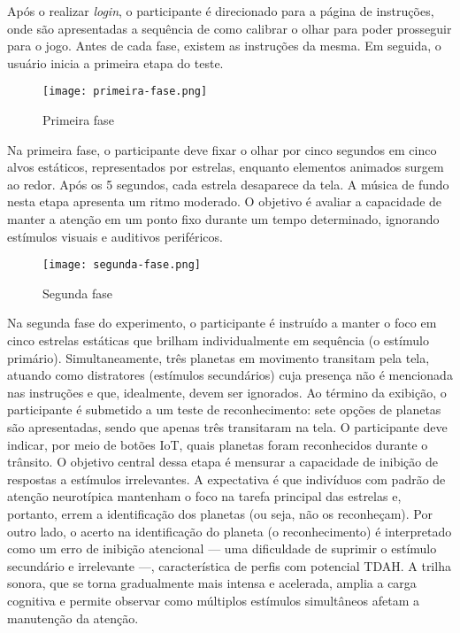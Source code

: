 Após o realizar \textit{login}, o participante é direcionado para a página de instruções, onde são apresentadas a sequência de como calibrar o olhar para poder prosseguir para o jogo. Antes de cada fase, existem as instruções da mesma. Em seguida, o usuário inicia a primeira etapa do teste. 

\begin{figure}[H]
    \centering
    \caption{Primeira fase}%
    \label{fig:primeira-fase}
    \texttt{[image: primeira-fase.png]}%
\end{figure}

Na primeira fase, o participante deve fixar o olhar por cinco segundos em cinco alvos estáticos,
representados por estrelas, enquanto elementos animados surgem ao redor. Após os 5 segundos,
cada estrela desaparece da tela. A música de fundo nesta etapa apresenta um ritmo moderado. O
objetivo é avaliar a capacidade de manter a atenção em um ponto fixo durante um tempo determinado, ignorando estímulos visuais e auditivos periféricos.

\begin{figure}[H]
    \centering
    \caption{Segunda fase}%
    \label{fig:segunda-fase}
    \texttt{[image: segunda-fase.png]}%
\end{figure}

Na segunda fase do experimento, o participante é instruído a manter o foco em cinco estrelas estáticas que brilham individualmente em sequência (o estímulo primário). Simultaneamente, três planetas em movimento transitam pela tela, atuando como distratores (estímulos secundários) cuja presença não é mencionada nas instruções e que, idealmente, devem ser ignorados. Ao término da exibição, o participante é submetido a um teste de reconhecimento: sete opções de planetas são apresentadas, sendo que apenas três transitaram na tela. O participante deve indicar, por meio de botões IoT, quais planetas foram reconhecidos durante o trânsito.
O objetivo central dessa etapa é mensurar a capacidade de inibição de respostas a estímulos irrelevantes. A expectativa é que indivíduos com padrão de atenção neurotípica mantenham o foco na tarefa principal das estrelas e, portanto, errem a identificação dos planetas (ou seja, não os reconheçam). Por outro lado, o acerto na identificação do planeta (o reconhecimento) é interpretado como um erro de inibição atencional — uma dificuldade de suprimir o estímulo secundário e irrelevante —, característica de perfis com potencial TDAH.
A trilha sonora, que se torna gradualmente mais intensa e acelerada, amplia a carga cognitiva e permite observar como múltiplos estímulos simultâneos afetam a manutenção da atenção.

